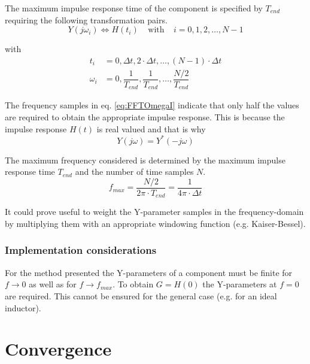 The maximum impulse response time of the component is specified by
$T_{end}$ requiring the following transformation pairs.
\begin{equation}
Y\left(j\omega_i\right) \Leftrightarrow H\left(t_i\right)
\;\;\;\; \textrm{with} \;\;\;\;
i = 0, 1, 2, \ldots, N-1
\end{equation}

with
\begin{align}
t_i &= 0, \Delta t, 2\cdot\Delta t, \ldots, \left(N-1\right)\cdot\Delta t\\
\label{eq:FFTOmegaI}
\omega_i &= 0, \dfrac{1}{T_{end}}, \dfrac{1}{T_{end}}, \ldots, \dfrac{N/2}{T_{end}}
\end{align}

The frequency samples in eq. \eqref{eq:FFTOmegaI} indicate that only
half the values are required to obtain the appropriate impulse
response.  This is because the impulse response $H\left(t\right)$ is
real valued and that is why
\begin{equation}
Y\left(j\omega\right) = Y^*\left(-j\omega\right)
\end{equation}

The maximum frequency considered is determined by the maximum impulse
response time $T_{end}$ and the number of time samples $N$.
\begin{equation}
f_{max} = \dfrac{N/2}{2\pi\cdot T_{end}} = \dfrac{1}{4\pi\cdot\Delta t}
\end{equation}

It could prove useful to weight the Y-parameter samples in the
frequency-domain by multiplying them with an appropriate windowing
function (e.g. Kaiser-Bessel).

\subsubsection{Implementation considerations}

For the method presented the Y-parameters of a component must be
finite for $f\rightarrow 0$ as well as for $f\rightarrow f_{max}$.  To
obtain $G = H\left(0\right)$ the Y-parameters at $f=0$ are required.
This cannot be ensured for the general case (e.g. for an ideal
inductor).

\section{Convergence}

